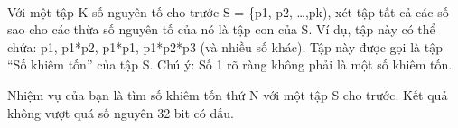  

Với một tập K số nguyên tố cho trước S = \{p1, p2, …,pk), xét tập tất cả các số sao cho các thừa số nguyên tố của nó là tập con của S. Ví dụ, tập này có thể chứa: p1, p1*p2, p1*p1, p1*p2*p3 (và nhiều số khác). Tập này được gọi là tập “Số khiêm tốn” của tập S. Chú ý: Số 1 rõ ràng không phải là một số khiêm tốn.

Nhiệm vụ của bạn là tìm số khiêm tốn thứ N với một tập S cho trước. Kết quả không vượt quá số nguyên 32 bit có dấu.